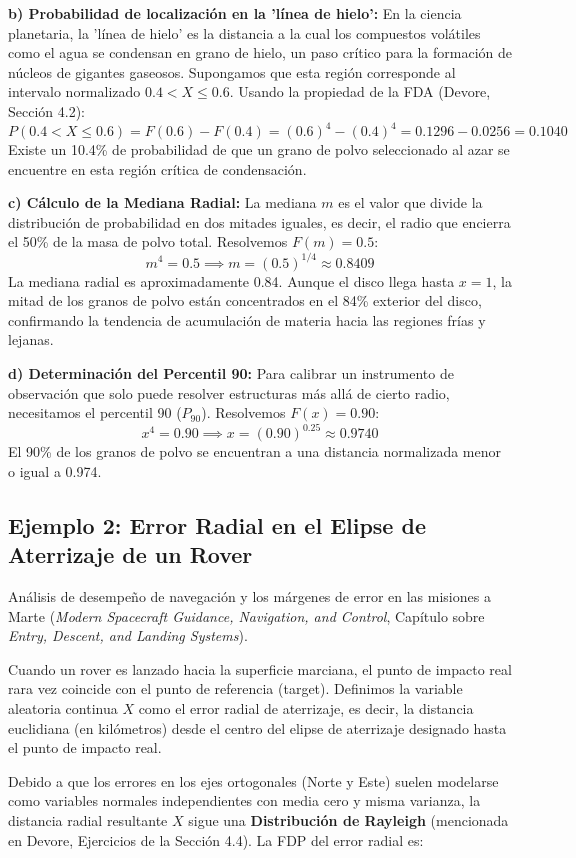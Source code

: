 \textbf{b) Probabilidad de localización en la 'línea de hielo':}
En la ciencia planetaria, la 'línea de hielo' es la distancia a la cual los compuestos volátiles como el agua se condensan en grano de hielo, un paso crítico para la formación de núcleos de gigantes gaseosos. Supongamos que esta región corresponde al intervalo normalizado $0.4 < X \le 0.6$. Usando la propiedad de la FDA (Devore, Sección 4.2):
$$ P(0.4 < X \le 0.6) = F(0.6) - F(0.4) = (0.6)^4 - (0.4)^4 = 0.1296 - 0.0256 = 0.1040 $$
Existe un 10.4\% de probabilidad de que un grano de polvo seleccionado al azar se encuentre en esta región crítica de condensación.

\textbf{c) Cálculo de la Mediana Radial:}
La mediana $m$ es el valor que divide la distribución de probabilidad en dos mitades iguales, es decir, el radio que encierra el 50\% de la masa de polvo total. Resolvemos $F(m) = 0.5$:
$$ m^4 = 0.5 \implies m = (0.5)^{1/4} \approx 0.8409 $$
La mediana radial es aproximadamente 0.84. Aunque el disco llega hasta $x=1$, la mitad de los granos de polvo están concentrados en el 84\% exterior del disco, confirmando la tendencia de acumulación de materia hacia las regiones frías y lejanas.

\textbf{d) Determinación del Percentil 90:}
Para calibrar un instrumento de observación que solo puede resolver estructuras más allá de cierto radio, necesitamos el percentil 90 ($P_{90}$). Resolvemos $F(x) = 0.90$:
$$ x^4 = 0.90 \implies x = (0.90)^{0.25} \approx 0.9740 $$
El 90\% de los granos de polvo se encuentran a una distancia normalizada menor o igual a 0.974.

\subsection{Ejemplo 2: Error Radial en el Elipse de Aterrizaje de un Rover}

Análisis de desempeño de navegación y los márgenes de error en las misiones a Marte (\textit{Modern Spacecraft Guidance, Navigation, and Control}, Capítulo sobre \textit{Entry, Descent, and Landing Systems}).

Cuando un rover es lanzado hacia la superficie marciana, el punto de impacto real rara vez coincide con el punto de referencia (target). Definimos la variable aleatoria continua $X$ como el error radial de aterrizaje, es decir, la distancia euclidiana (en kilómetros) desde el centro del elipse de aterrizaje designado hasta el punto de impacto real. 

Debido a que los errores en los ejes ortogonales (Norte y Este) suelen modelarse como variables normales independientes con media cero y misma varianza, la distancia radial resultante $X$ sigue una \textbf{Distribución de Rayleigh} (mencionada en Devore, Ejercicios de la Sección 4.4). La FDP del error radial es:

